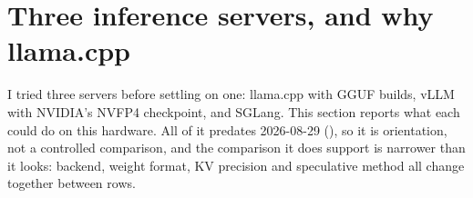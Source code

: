\section{Three inference servers, and why llama.cpp}\label{sec:servers}

I tried three servers before settling on one: llama.cpp with GGUF builds, vLLM with NVIDIA's NVFP4
checkpoint, and SGLang. This section reports what each could do on this hardware. All of it predates
2026-08-29 (\hist), so it is orientation, not a controlled comparison, and the comparison it does
support is narrower than it looks: backend, weight format, KV precision and speculative method all
change together between rows.

\begin{table}[t]
\centering\small
\caption{One probe across engines\hist: greedy, 1{,}024-token generation, single stream, median of three
runs, \textbf{decode into a nearly empty KV cache}. vLLM runs tensor-parallel across both cards with
. Power is GPU telemetry plus CPU package plus a fixed platform allowance
(modelled). Context ceiling is the largest window that boots (vLLM) or that prefills and generates
(llama.cpp); the llama.cpp ceilings are first-battery values from \cref{sec:context}, the only
non-historical cells in this table, shown for orientation.}\label{tab:backends}
\end{table}

